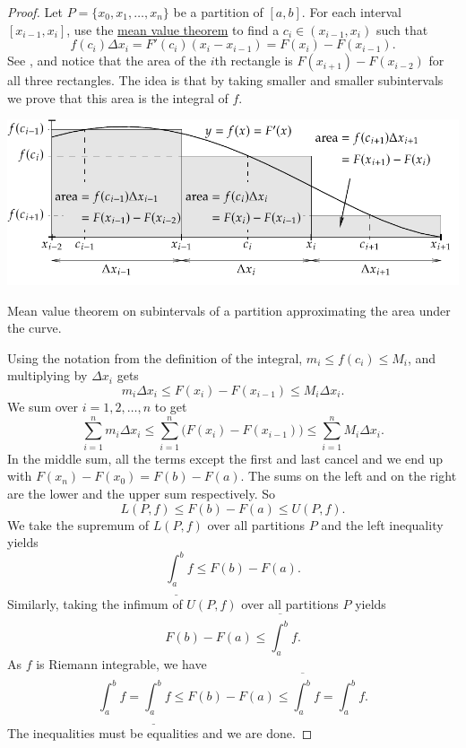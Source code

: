 \begin{proof}
Let $P = \{ x_0, x_1, \ldots, x_n \}$ be a partition of $[a,b]$.
For each interval $[x_{i-1},x_i]$, use the
\hyperref[thm:mvt]{mean value theorem} to find a
$c_i \in (x_{i-1},x_i)$ such that
\begin{equation*}
f(c_i) \Delta x_i = F'(c_i) (x_i - x_{i-1}) = F(x_i) - F(x_{i-1}) .
\end{equation*}
See , and
notice that the area of the
$i$th rectangle is
$F(x_{i+1})-F(x_{i-2})$
for all three rectangles.
The idea is that by taking smaller and smaller subintervals
we prove that this area is the integral of $f$.
\begin{myfigureht}
\includegraphics{figures/fundthmfig}
\caption{Mean value theorem on subintervals of a partition
approximating the area under the curve.\label{fig:fundthmfig}}
\end{myfigureht}

Using the notation from the definition of the integral,
$m_i \leq f(c_i) \leq M_i$, and multiplying by $\Delta x_i$ gets
\begin{equation*}
m_i \Delta x_i \leq F(x_i) - F(x_{i-1}) \leq M_i \Delta x_i .
\end{equation*}
We sum over $i = 1,2, \ldots, n$ to get
\begin{equation*}
\sum_{i=1}^n m_i \Delta x_i
\leq \sum_{i=1}^n \bigl(F(x_i) - F(x_{i-1}) \bigr)
\leq \sum_{i=1}^n M_i \Delta x_i .
\end{equation*}
In the middle sum, all the terms except the first and last cancel 
and we end up with $F(x_n)-F(x_0) = F(b)-F(a)$.  The sums on the left
and on the right are the lower and the upper sum respectively.  So
\begin{equation*}
L(P,f) \leq F(b)-F(a) \leq U(P,f) .
\end{equation*}
We take the supremum of $L(P,f)$ over all partitions $P$ and the left inequality
yields 
\begin{equation*}
\underline{\int_a^b} f \leq F(b)-F(a) .
\end{equation*}
Similarly, taking
the infimum of $U(P,f)$ over all partitions $P$ yields
\begin{equation*}
F(b)-F(a) \leq \overline{\int_a^b} f .
\end{equation*}
As $f$ is Riemann integrable, we have
\begin{equation*}
\int_a^b f =
\underline{\int_a^b} f \leq F(b)-F(a) \leq \overline{\int_a^b} f
= \int_a^b f .
\end{equation*}
The inequalities must be equalities and we are done.
\end{proof}

